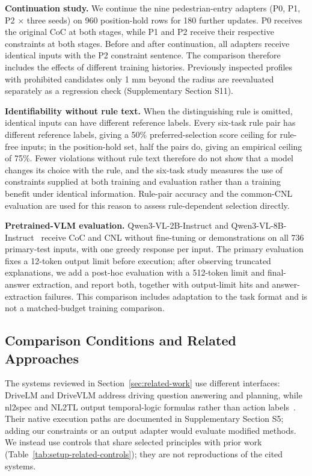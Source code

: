 \noindent\textbf{Continuation study.}
We continue the nine pedestrian-entry adapters (P0, P1, P2 $\times$ three
seeds) on 960 position-hold rows for 180 further updates. P0 receives the
original CoC at both stages, while P1 and P2 receive their respective
constraints at both stages. Before and after continuation, all adapters
receive identical inputs with the P2 constraint sentence. The comparison
therefore includes the effects of different training histories. Previously
inspected profiles with prohibited candidates only 1 mm beyond the radius are
reevaluated separately as a regression check (Supplementary Section S11).

\noindent\textbf{Identifiability without rule text.}
When the distinguishing rule is omitted, identical inputs can have different
reference labels. Every six-task rule pair has different reference labels, giving a
50\% preferred-selection score ceiling for rule-free inputs; in the position-hold set, half the
pairs do, giving an empirical ceiling of 75\%. Fewer violations without rule
text therefore do not show that a model changes its choice with the rule, and
the six-task study measures the use of constraints supplied at both training
and evaluation rather than a training benefit under identical information.
Rule-pair accuracy and the common-CNL evaluation are used for this reason to
assess rule-dependent selection directly.

\noindent\textbf{Pretrained-VLM evaluation.}
Qwen3-VL-2B-Instruct and Qwen3-VL-8B-Instruct~\cite{qwen2025qwen3vl2b,qwen2025qwen3vl8b}
receive CoC and CNL without fine-tuning or demonstrations on all 736
primary-test inputs, with one greedy response per input. The primary evaluation
fixes a 12-token output limit before execution; after observing truncated
explanations, we add a post-hoc evaluation with a 512-token limit and
final-answer extraction, and report both, together with output-limit hits and
answer-extraction failures. This comparison includes adaptation
to the task format and is not a matched-budget training comparison.

\subsection{Comparison Conditions and Related Approaches}\label{sec:setup-related}

The systems reviewed in Section~\ref{sec:related-work} use different
interfaces: DriveLM and DriveVLM address driving question answering and
planning, while nl2spec and NL2TL output temporal-logic formulas rather than
action labels~\cite{r2,r3,r8,r9}. Their native execution paths are documented
in Supplementary Section S5; adding our constraints or an output adapter would
evaluate modified methods. We instead use controls that share selected
principles with prior work (Table~\ref{tab:setup-related-controls}); they are
not reproductions of the cited systems.

